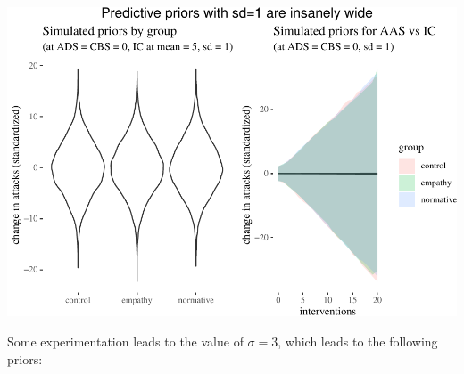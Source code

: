 \documentclass[10pt,dvipsnames,enabledeprecatedfontcommands]{scrartcl}
\begin{document}
\begin{center}\includegraphics[width=1\linewidth]{bayesianReport_files/figure-latex/unnamed-chunk-6-1} \end{center}

\normalsize

Some experimentation leads to the value of \(\sigma =3\), which leads to
the following priors:

\vspace{1mm} \footnotesize
\end{document}
